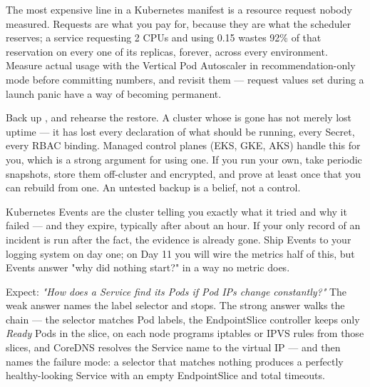 \begin{costnote}
The most expensive line in a Kubernetes manifest is a resource request nobody measured. Requests are what you pay for, because they are what the scheduler reserves; a service requesting 2 CPUs and using 0.15 wastes 92\% of that reservation on every one of its replicas, forever, across every environment. Measure actual usage with the Vertical Pod Autoscaler in recommendation-only mode before committing numbers, and revisit them --- request values set during a launch panic have a way of becoming permanent.
\end{costnote}

\begin{drtip}
Back up , and rehearse the restore. A cluster whose  is gone has not merely lost uptime --- it has lost every declaration of what should be running, every Secret, every RBAC binding. Managed control planes (EKS, GKE, AKS) handle this for you, which is a strong argument for using one. If you run your own, take periodic snapshots, store them off-cluster and encrypted, and prove at least once that you can rebuild from one. An untested backup is a belief, not a control.
\end{drtip}

\begin{opsnote}
Kubernetes Events are the cluster telling you exactly what it tried and why it failed --- and they expire, typically after about an hour. If your only record of an incident is  run after the fact, the evidence is already gone. Ship Events to your logging system on day one; on Day 11 you will wire the metrics half of this, but Events answer "why did nothing start?" in a way no metric does.
\end{opsnote}

\begin{interview}
Expect: \emph{"How does a Service find its Pods if Pod IPs change constantly?"} The weak answer names the label selector and stops. The strong answer walks the chain --- the selector matches Pod labels, the EndpointSlice controller keeps only \emph{Ready} Pods in the slice,  on each node programs iptables or IPVS rules from those slices, and CoreDNS resolves the Service name to the virtual IP --- and then names the failure mode: a selector that matches nothing produces a perfectly healthy-looking Service with an empty EndpointSlice and total timeouts.
\end{interview}


